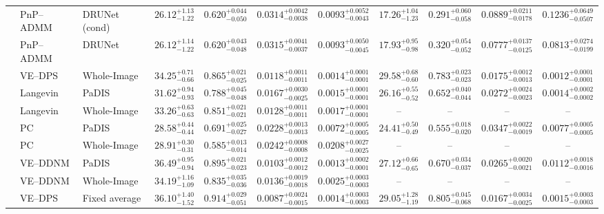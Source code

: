 \begin{landscape}
\begin{table}[p]
{\begin{tabular}{lllcccccccc}
 & PnP--ADMM & DRUNet (cond) & $26.12^{+1.13}_{-1.22}$ & $0.620^{+0.044}_{-0.050}$ & $0.0314^{+0.0042}_{-0.0038}$ & $0.0093^{+0.0052}_{-0.0043}$ & $17.26^{+1.04}_{-1.23}$ & $0.291^{+0.060}_{-0.058}$ & $0.0889^{+0.0211}_{-0.0178}$ & $0.1236^{+0.0649}_{-0.0507}$ \\
 & PnP--ADMM & DRUNet & $26.12^{+1.14}_{-1.22}$ & $0.620^{+0.043}_{-0.048}$ & $0.0315^{+0.0041}_{-0.0037}$ & $0.0093^{+0.0050}_{-0.0045}$ & $17.93^{+0.95}_{-0.98}$ & $0.320^{+0.054}_{-0.052}$ & $0.0777^{+0.0137}_{-0.0125}$ & $0.0813^{+0.0274}_{-0.0199}$ \\
 & VE--DPS & Whole-Image & $34.25^{+0.71}_{-0.66}$ & $0.865^{+0.021}_{-0.025}$ & $0.0118^{+0.0011}_{-0.0011}$ & $0.0014^{+0.0001}_{-0.0001}$ & $\mathbf{29.58^{+0.68}_{-0.60}}$ & $0.783^{+0.023}_{-0.023}$ & $0.0175^{+0.0012}_{-0.0013}$ & $\mathbf{0.0012^{+0.0001}_{-0.0001}}$ \\
 & Langevin & PaDIS & $31.62^{+0.94}_{-0.93}$ & $0.788^{+0.045}_{-0.048}$ & $0.0167^{+0.0030}_{-0.0025}$ & $0.0015^{+0.0001}_{-0.0001}$ & $26.16^{+0.55}_{-0.52}$ & $0.652^{+0.040}_{-0.044}$ & $0.0272^{+0.0024}_{-0.0023}$ & $0.0014^{+0.0002}_{-0.0002}$ \\
 & Langevin & Whole-Image & $33.26^{+0.63}_{-0.63}$ & $0.851^{+0.021}_{-0.021}$ & $0.0128^{+0.0011}_{-0.0011}$ & $0.0017^{+0.0001}_{-0.0001}$ & -- & -- & -- & -- \\
 & PC & PaDIS & $28.58^{+0.44}_{-0.44}$ & $0.691^{+0.025}_{-0.027}$ & $0.0228^{+0.0013}_{-0.0013}$ & $0.0072^{+0.0005}_{-0.0005}$ & $24.41^{+0.50}_{-0.49}$ & $0.555^{+0.018}_{-0.020}$ & $0.0347^{+0.0022}_{-0.0019}$ & $0.0077^{+0.0005}_{-0.0005}$ \\
 & PC & Whole-Image & $28.91^{+0.30}_{-0.31}$ & $0.585^{+0.013}_{-0.014}$ & $0.0242^{+0.0008}_{-0.0008}$ & $0.0208^{+0.0027}_{-0.0025}$ & -- & -- & -- & -- \\
 & VE--DDNM & PaDIS & $\mathbf{36.49^{+0.95}_{-0.94}}$ & $0.895^{+0.021}_{-0.023}$ & $0.0103^{+0.0012}_{-0.0012}$ & $\mathbf{0.0013^{+0.0002}_{-0.0001}}$ & $27.12^{+0.66}_{-0.65}$ & $0.670^{+0.034}_{-0.037}$ & $0.0265^{+0.0020}_{-0.0021}$ & $0.0112^{+0.0018}_{-0.0016}$ \\
 & VE--DDNM & Whole-Image & $34.19^{+1.16}_{-1.09}$ & $0.835^{+0.035}_{-0.036}$ & $0.0136^{+0.0019}_{-0.0018}$ & $0.0025^{+0.0003}_{-0.0003}$ & -- & -- & -- & -- \\
 & VE--DPS & Fixed average & $36.10^{+1.40}_{-1.52}$ & $\mathbf{0.914^{+0.029}_{-0.051}}$ & $\mathbf{0.0087^{+0.0024}_{-0.0015}}$ & $0.0014^{+0.0003}_{-0.0003}$ & $29.05^{+1.28}_{-1.19}$ & $\mathbf{0.805^{+0.045}_{-0.068}}$ & $\mathbf{0.0167^{+0.0034}_{-0.0025}}$ & $0.0015^{+0.0003}_{-0.0003}$ \\

\end{tabular}}
\end{table}
\end{landscape}
